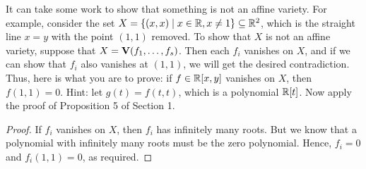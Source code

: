 \begin{exercise}{8}
It can take some work to show that something is not an affine variety. For example, consider the set $X=\{(x,x)\mid x\in\mathbb{R}, x\neq 1\}\subseteq\mathbb{R}^2$, which is the straight line $x=y$ with the point $(1,1)$ removed. To show that $X$ is not an affine variety, suppose that $X=\mathbf{V}(f_1,\dots,f_s)$. Then each $f_i$ vanishes on $X$, and if we can show that $f_i$ also vanishes at $(1,1)$, we will get the desired contradiction. Thus, here is what you are to prove: if $f\in\mathbb{R}[x,y]$ vanishes on $X$, then $f(1,1)=0$. Hint: let $g(t)=f(t,t)$, which is a polynomial $\mathbb{R}[t]$. Now apply the proof of Proposition 5 of Section 1.
\end{exercise}
\begin{proof}
 If $f_i$ vanishes on $X$, then $f_i$ has infinitely many roots. But we know that a polynomial with infinitely many roots must be the zero polynomial. Hence, $f_i=0$ and $f_i(1,1)=0$, as required.
\end{proof}


